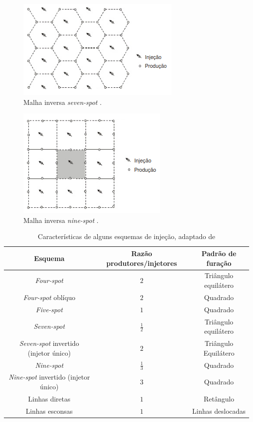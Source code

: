 \begin{figure}[!ht]
\centering
\includegraphics[width=.6\textwidth]{figs/revisao/revisao_inj7i.png}
\caption{Malha inversa \textit{seven-spot} \cite[p. 569]{engres}.}
\label{fig:rev_inj7i}
\end{figure}

\begin{figure}[!ht]
\centering
\includegraphics[width=.6\textwidth]{figs/revisao/revisao_inj9i.png}
\caption{Malha inversa \textit{nine-spot} \cite[p. 569]{engres}.}
\label{fig:rev_inj9i}
\end{figure}

\begin{table}[!ht]
	\centering
	\caption{Caracter\'{i}sticas de alguns esquemas de inje\c{c}\~{a}o, adaptado de \cite{singh1982}\label{tab:wfdpat}}
	\begin{tabular}{|c|c|c|}
		\hline
		\textbf{Esquema} & \textbf{Raz\~{a}o produtores/injetores} & \textbf{Padr\~{a}o de fura\c{c}\~{a}o} \\ \hline
		\textit{Four-spot} & $2$ & Tri\^{a}ngulo equil\'{a}tero \\ \hline
		\textit{Four-spot} obl\'{i}quo & $2$ & Quadrado \\ \hline
		\textit{Five-spot} & $1$ & Quadrado \\ \hline
		\textit{Seven-spot} & $\frac{1}{2}$ & Tri\^{a}ngulo equil\'{a}tero \\ \hline
		\textit{Seven-spot} invertido (injetor \'{u}nico) & $2$ & Tri\^{a}ngulo Equil\'{a}tero \\ \hline
		\textit{Nine-spot} & $\frac{1}{3}$ & Quadrado \\ \hline
		\textit{Nine-spot} invertido (injetor \'{u}nico) & $3$ & Quadrado \\ \hline
		Linhas diretas & $1$ & Ret\^{a}ngulo \\ \hline
		Linhas esconsas & $1$ & Linhas deslocadas \\ \hline
		
	\end{tabular}
\end{table}

